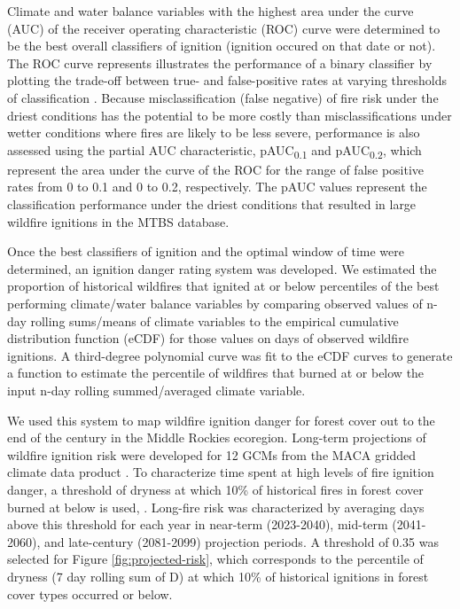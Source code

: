 \documentclass[11pt]{article}
\newcommand{\pauc}[1]{pAUC\textsubscript{#1}}
\begin{document}
Climate and water balance variables with the highest area under the curve (AUC) of the receiver operating characteristic (ROC) curve were determined to be the best overall classifiers of ignition (ignition occured on that date or not).  The ROC curve represents illustrates the performance of a binary classifier by plotting the trade-off between true- and false-positive rates at varying thresholds of classification \citep{pontiusRecommendationsUsingRelative2014}. Because misclassification (false negative) of fire risk under the driest conditions has the potential to be more costly than misclassifications under wetter conditions where fires are likely to be less severe, performance is also assessed using the partial AUC characteristic, \pauc{0.1} and \pauc{0.2}, which represent the area under the curve of the ROC for the range of false positive rates from 0 to 0.1 and 0 to 0.2, respectively. The pAUC values represent the classification performance under the driest conditions that resulted in large wildfire ignitions in the MTBS database.   

Once the best classifiers of ignition and the optimal window of time were determined, an ignition danger rating system was developed.  We estimated the proportion of historical wildfires that ignited at or below percentiles of the best performing climate/water balance variables by comparing observed values of n-day rolling sums/means of climate variables to the empirical cumulative distribution function (eCDF) for those values on days of observed wildfire ignitions. A third-degree polynomial curve was fit to the eCDF curves to generate a function to estimate the percentile of wildfires that burned at or below the input n-day rolling summed/averaged climate variable. 

We used this system to map wildfire ignition danger for forest cover out to the end of the century in the Middle Rockies ecoregion. Long-term projections of wildfire ignition risk were developed for 12 GCMs from the MACA gridded climate data product \citep{abatzoglouComparisonStatisticalDownscaling2012}. To characterize time spent at high levels of fire ignition danger, a threshold of dryness at which 10\% of historical fires in forest cover burned at below is used, .  Long-fire risk was characterized by averaging days above this threshold for each year in near-term (2023-2040), mid-term (2041-2060), and late-century (2081-2099) projection periods.  A threshold of 0.35 was selected for Figure \ref{fig:projected-risk}, which corresponds to the percentile of dryness (7 day rolling sum of D) at which 10\% of historical ignitions in forest cover types occurred or below.
\end{document}

